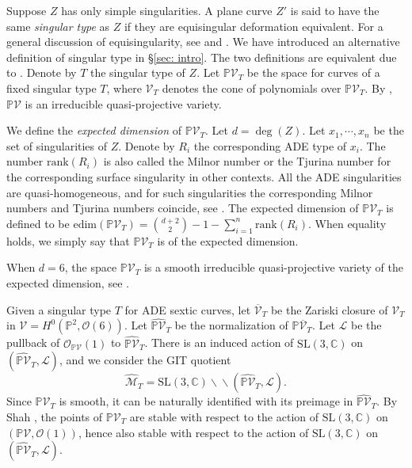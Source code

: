 \documentclass[12pt,reqno,a4paper]{amsart}
\theoremstyle{remark}
\theoremstyle{definition}
\begin{document}
Suppose $Z$ has only simple singularities.
A plane curve $Z'$ is said to have the same \emph{singular type} as $Z$ if they are equisingular deformation equivalent.
For a general discussion of equisingularity, see \cite{zariski1965equisingularityI,zariski1965equisingularityII,zariski1968equisingularityIII} and \cite{greuel2007singularities}.
We have introduced an alternative definition of singular type in \S \ref{sec: intro}.
The two definitions are equivalent due to \cite[Proposition 2.1]{greuel1996equianalytic}.
Denote by $T$ the singular type of $Z$.
Let $\mathbb{P}\mathcal{V}_T$ be the space for curves of a fixed singular type $T$, where $\mathcal{V}_T$ denotes the cone of polynomials over $\mathbb{P}\mathcal{V}_T$. By \cite[Prop 2.1]{greuel1996equianalytic}, $\mathbb{P}\mathcal{V}$ is an irreducible quasi-projective variety.


We define the \emph{expected dimension} of $\mathbb{P}\mathcal{V}_T$. Let $d=\deg(Z)$. 
Let $x_1,\cdots,x_n$ be the set of singularities of $Z$.
Denote by $R_i$ the corresponding ADE type of $x_i$. The number $\mathrm{rank}(R_i)$ is also called the Milnor number or the Tjurina number for the corresponding surface singularity in other contexts. 
All the ADE singularities are quasi-homogeneous, and for such singularities the corresponding Milnor numbers and Tjurina numbers coincide, see \cite{saito1971quasihomogene}.
The expected dimension of $\mathbb{P}\mathcal{V}_T$ is defined to be $\mathrm{edim}(\mathbb{P}\mathcal{V}_T)=\binom{d+2}{2}-1-\sum\limits_{i=1}^n \mathrm{rank}(R_i)$. 
When equality holds, we simply say that $\mathbb{P}\mathcal{V}_T$ is of the expected dimension.


When $d=6$, the space $\mathbb{P}\mathcal{V}_T$ is a smooth irreducible quasi-projective variety of the expected dimension, see \cite[Corollary 5.1(b)]{greuel1996equianalytic}. 

Given a singular type $T$ for ADE sextic curves, let $\overline{\mathcal{V}}_T$ be the Zariski closure of $\mathcal{V}_T$ in $\mathcal{V}=H^0(\mathbb{P}^2, \mathcal{O}(6))$. Let $\widehat{\mathbb{P}\mathcal{V}}_T$ be the normalization of $\mathbb{P}\overline{\mathcal{V}}_T$. Let $\mathcal{L}$ be the pullback of $\mathcal{O}_{\mathbb{P}\mathcal{V}}(1)$ to $\widehat{\mathbb{P}\mathcal{V}}_T$. There is an induced action of $\mathrm{SL}(3, \mathbb{C})$ on $(\widehat{\mathbb{P}\mathcal{V}}_T, \mathcal{L})$, and we consider the GIT quotient
\[
\widehat{\mathcal{M}}_T=\mathrm{SL}(3, \mathbb{C}) \backslash\!\! \backslash (\widehat{\mathbb{P}\mathcal{V}}_T, \mathcal{L}).
\]
Since $\mathbb{P}\mathcal{V}_T$ is smooth, it can be naturally identified with its preimage in $\widehat{\mathbb{P}\mathcal{V}}_T$. By Shah \cite{shah1980complete}, the points of $\mathbb{P}\mathcal{V}_T$ are stable with respect to the action of $\mathrm{SL}(3, \mathbb{C})$ on $(\mathbb{P}\mathcal{V}, \mathcal{O}(1))$, hence also stable with respect to the action of $\mathrm{SL}(3, \mathbb{C})$ on $(\widehat{\mathbb{P}\mathcal{V}}_T, \mathcal{L})$.
\end{document}
